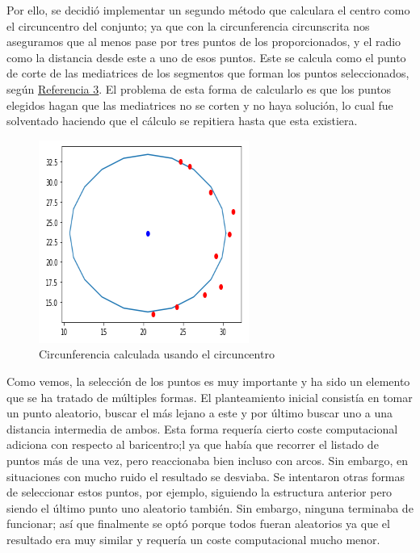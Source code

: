 \documentclass[conference,a4paper]{IEEEtran}
\begin{document}
Por ello, se decidió implementar un segundo método que calculara el centro como el circuncentro del conjunto; ya que con la circunferencia circunscrita nos aseguramos que al menos pase por tres puntos de los proporcionados, y el radio como la distancia desde este a uno de esos puntos. Este se calcula como el punto de corte de las mediatrices de los segmentos que forman los puntos seleccionados, según \hyperref[bib:georgeSeif]{Referencia 3}. El problema de esta forma de calcularlo es que los puntos elegidos hagan que las mediatrices no se corten y no haya solución, lo cual fue solventado haciendo que el cálculo se repitiera hasta que esta existiera.\\

\begin{figure}[H]
\centering
\includegraphics[scale=0.8]{ArcoCircuncentroResultado}
\caption{Circunferencia calculada usando el circuncentro}
\end{figure}

Como vemos, la selección de los puntos es muy importante y ha sido un elemento que se ha tratado de múltiples formas. El planteamiento inicial  consistía en tomar un punto aleatorio, buscar el más lejano a este y por último buscar uno a una distancia intermedia de ambos. Esta forma requería cierto coste computacional adiciona con respecto al baricentro;l ya que había que recorrer el listado de puntos más de una vez, pero reaccionaba bien incluso con arcos. Sin embargo, en situaciones con mucho ruido el resultado se desviaba. Se intentaron otras formas de seleccionar estos puntos, por ejemplo, siguiendo la estructura anterior pero siendo el último punto uno aleatorio también. Sin embargo, ninguna terminaba de funcionar; así que finalmente se optó porque todos fueran aleatorios ya que el resultado era muy similar y requería un coste computacional mucho menor.\\
\end{document}

